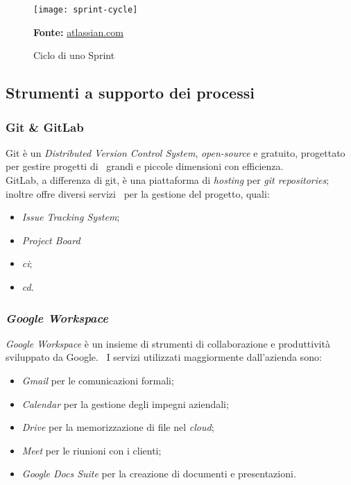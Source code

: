 \clearpage

\vspace{20pt}
  \begin{figure}[!ht]
    \begin{center}
      \texttt{[image: sprint-cycle]}
      \caption{Ciclo di uno Sprint}
      \textbf{Fonte:} \href{https://www.atlassian.com}{atlassian.com}
    \end{center}
  \end{figure}
\vspace{20pt} 

\subsection{Strumenti a supporto dei processi}

\subsubsection{Git \& GitLab}
Git è un \emph{Distributed Version Control System}, \emph{open-source} e gratuito, progettato per gestire progetti di \
grandi e piccole dimensioni con efficienza. \\

GitLab, a differenza di git, è una piattaforma di \emph{hosting} per \emph{git repositories}; inoltre offre diversi servizi \
per la gestione del progetto, quali:

\begin{itemize}
  \item \emph{Issue Tracking System};
  \item \emph{Project Board}
  \item \emph{\acrfull{ci}};
  \item \emph{\acrfull{cd}}.
\end{itemize}

\subsubsection{\emph{Google Workspace}}
\emph{Google Workspace} è un insieme di strumenti di collaborazione e produttività sviluppato da Google. \
I servizi utilizzati maggiormente dall'azienda sono:

\begin{itemize}
  \item \emph{Gmail} per le comunicazioni formali;
  \item \emph{Calendar} per la gestione degli impegni aziendali;
  \item \emph{Drive} per la memorizzazione di file nel \emph{cloud};
  \item \emph{Meet} per le riunioni con i clienti;
  \item \emph{Google Docs Suite} per la creazione di documenti e presentazioni.
\end{itemize}


